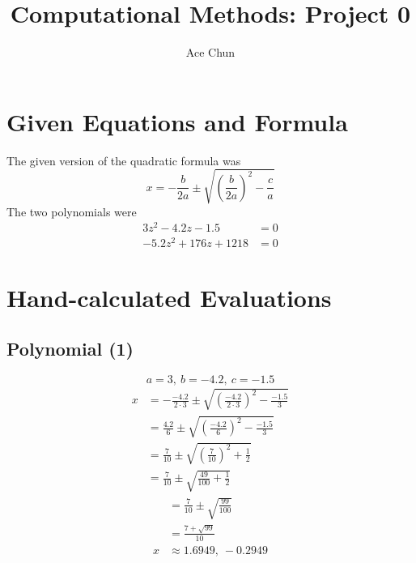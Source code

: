 \documentclass[12pt]{article}
\title{Computational Methods: Project 0}
\author{Ace Chun}
\begin{document}
\maketitle

\section{Given Equations and Formula}
    The given version of the quadratic formula was 
    \[x = -\frac{b}{2a} \pm \sqrt{ \left( \frac{b}{2a} \right)^2 - \frac{c}{a}}\]
    The two polynomials were 
    \begin{align}
        3z^2 - 4.2z - 1.5 &= 0 \\
        -5.2z^2 + 176z + 1218 &= 0
    \end{align}

\section{Hand-calculated Evaluations}
    \subsection*{Polynomial (1)}
        \[a = 3,\ b = -4.2,\ c = -1.5\]
        \begin{align*}
            x &= -\frac{-4.2}{2 \cdot 3} \pm \sqrt{ \left(\frac{-4.2}{2 \cdot 3} \right)^2 - \frac{-1.5}{3}} \\
            &= \frac{4.2}{6} \pm \sqrt{\left(\frac{-4.2}{6} \right)^2 - \frac{-1.5}{3}} \\
            &= \frac{7}{10} \pm \sqrt{\left(\frac{7}{10} \right)^2 + \frac{1}{2}} \\
            &= \frac{7}{10} \pm \sqrt{\frac{49}{100} + \frac{1}{2}}
        \end{align*}
        \begin{align*}
            &= \frac{7}{10} \pm \sqrt{\frac{99}{100}} \\
            &= \frac{7 + \sqrt{99}}{10} \\
            x &\approx 1.6949,\ -0.2949
        \end{align*}
\end{document}
